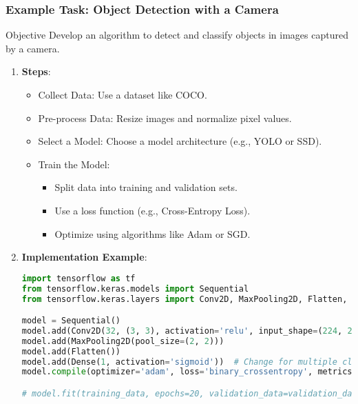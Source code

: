 \documentclass{beamer}
\begin{document}
\begin{frame}[fragile]
    \frametitle{Example Task: Object Detection with a Camera}
    \begin{block}{Objective}
        Develop an algorithm to detect and classify objects in images captured by a camera.
    \end{block}

    \begin{enumerate}
        \item \textbf{Steps}:
        \begin{itemize}
            \item Collect Data: Use a dataset like COCO.
            \item Pre-process Data: Resize images and normalize pixel values.
            \item Select a Model: Choose a model architecture (e.g., YOLO or SSD).
            \item Train the Model:
            \begin{itemize}
                \item Split data into training and validation sets.
                \item Use a loss function (e.g., Cross-Entropy Loss).
                \item Optimize using algorithms like Adam or SGD.
            \end{itemize}
        \end{itemize}
        
        \item \textbf{Implementation Example}:
        \begin{lstlisting}[language=Python]
import tensorflow as tf
from tensorflow.keras.models import Sequential
from tensorflow.keras.layers import Conv2D, MaxPooling2D, Flatten, Dense

model = Sequential()
model.add(Conv2D(32, (3, 3), activation='relu', input_shape=(224, 224, 3)))
model.add(MaxPooling2D(pool_size=(2, 2)))
model.add(Flatten())
model.add(Dense(1, activation='sigmoid'))  # Change for multiple classes
model.compile(optimizer='adam', loss='binary_crossentropy', metrics=['accuracy'])

# model.fit(training_data, epochs=20, validation_data=validation_data)
        \end{lstlisting}
    \end{enumerate}
\end{frame}
\end{document}
